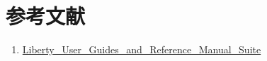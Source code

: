 \section{参考文献}
\begin{enumerate}
  \item \href{}{Liberty\_User\_Guides\_and\_Reference\_Manual\_Suite}
\end{enumerate}
